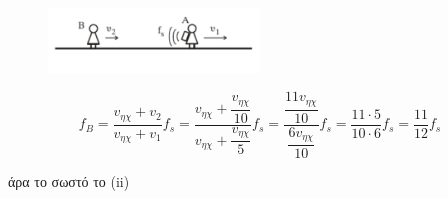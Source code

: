 \documentclass[12pt]{article}
\begin{document}
\begin{enumerate}
    \begin{figure}[h]
      \includegraphics[width=0.5\textwidth]{ΦυσικήΒ3.png}
      \centering
    \end{figure}

    $$f_Β=\dfrac{v_{ηχ}+v_2}{v_{ηχ}+v_1}f_s=\dfrac{v_{ηχ}+\dfrac{v_{ηχ}}{10}}{v_{ηχ}+\dfrac{v_{ηχ}}{5}}f_s=\dfrac{\dfrac{11v_{ηχ}}{10}}{\dfrac{6v_{ηχ}}{10}}f_s=\dfrac{11\cdot5}{10\cdot6}f_s=\dfrac{11}{12}f_s $$

    άρα το σωστό το (ii)
  \end{enumerate}
\end{document}

